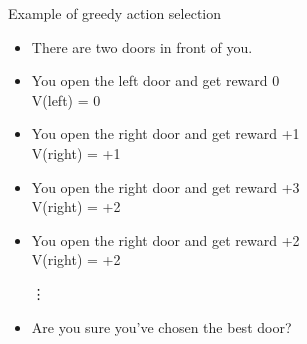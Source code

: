 \bgroup
\begin{frame}{Example of greedy action selection}
\begin{minipage}{0.3\textwidth}

\end{minipage}
\begin{minipage}{0.65\textwidth}
\begin{itemize}
\item There are two doors in front of you.
\item You open the left door and get reward 0\\
\textcolor{mImagelabRed}{V(left) = 0}
\item You open the right door and get reward +1\\
\textcolor{mImagelabRed}{V(right) = +1}
\item You open the right door and get reward +3\\
\textcolor{mImagelabRed}{V(right) = +2}
\item You open the right door and get reward +2\\
\textcolor{mImagelabRed}{V(right) = +2}\\
\begin{center}
\vdots
\end{center}
\item Are you sure you've chosen the best door?
\end{itemize}
\end{minipage}
\end{frame}
\egroup